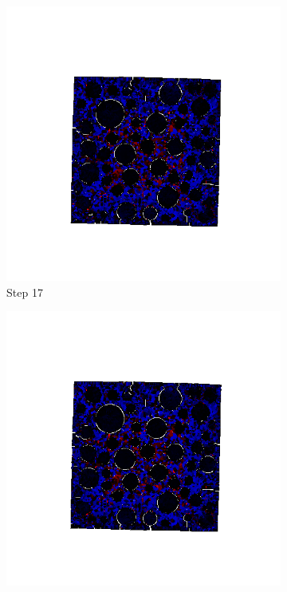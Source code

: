 \begin{figure}[ht!]
      \begin{subfigure}{.25\textwidth}
        \centering
        \includegraphics[width=1.0\linewidth]{Files/A30X0C_3_IS/DEP50-STEP(017).png}
      \caption{Step 17}
      \end{subfigure}%
      \begin{subfigure}{.25\textwidth}
        \centering
        \includegraphics[width=1.0\linewidth]{Files/A30X0C_3_IS/DEP50-STEP(018).png}

\end{subfigure}
\end{figure}
